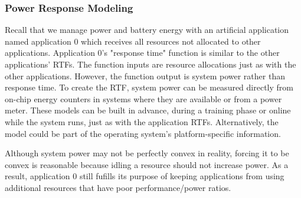 \subsubsection*{Power Response Modeling}
Recall that we manage power and battery energy with an artificial application named application 0 which receives all resources not allocated to other applications. Application 0's "response time" function is similar to the other applications' RTFs.  The function inputs are resource allocations just as with the other applications.  However, the function output is system power rather than response time.   To create the RTF, system power can be measured directly from on-chip energy counters in systems where they are available or from a power meter.  These models can be built in advance, during a training phase or online while the system runs, just as with the application RTFs.  Alternatively, the model could be part of the operating system's platform-specific information.

Although system power may not be perfectly convex in reality, forcing it to be convex is reasonable because idling a resource should not increase power.  As a result, application 0 still fufills its purpose of keeping applications from using additional resources that have poor performance/power ratios.

